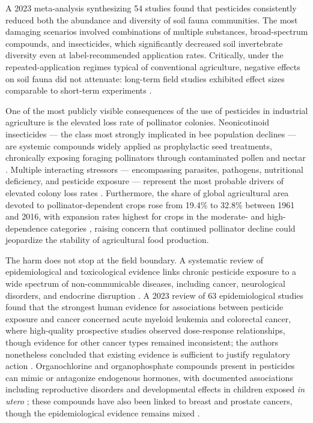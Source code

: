 A 2023 meta-analysis synthesizing 54 studies found that pesticides
consistently reduced both the abundance and diversity of soil fauna
communities. The most damaging scenarios involved combinations of multiple substances, broad-spectrum compounds, and insecticides, which significantly decreased soil invertebrate diversity even at label-recommended application rates.
Critically, under the repeated-application regimes typical of conventional agriculture, negative effects on soil fauna did not attenuate: long-term field studies exhibited effect sizes comparable to short-term experiments \cite[Sections~3.2--3.3,~4.2]{beaumelle2023}.
 

One of the most publicly visible consequences of the use of pesticides in industrial agriculture is the elevated loss rate of pollinator colonies. Neonicotinoid insecticides --- the class most strongly implicated in bee population declines --- are systemic compounds widely applied as prophylactic seed treatments, chronically exposing foraging pollinators through contaminated pollen and nectar \cite[pp.~1255957-4--1255957-5]{goulson2015bees}. Multiple interacting stressors --- encompassing parasites, pathogens, nutritional deficiency, and pesticide exposure --- represent the most probable drivers of elevated colony loss rates \cite[p.~1255957-5]{goulson2015bees}. Furthermore, the share of global agricultural area devoted to pollinator-dependent crops rose from 19.4\% to 32.8\% between 1961 and 2016, with expansion rates highest for crops in the moderate- and high-dependence categories \cite[p.~3520]{aizen2019pollinator}, raising concern that continued pollinator decline could jeopardize the stability of agricultural food production.
 
The harm does not stop at the field boundary.
A systematic review of epidemiological and toxicological evidence links chronic pesticide exposure to a wide spectrum of non-communicable diseases, including cancer, neurological disorders, and endocrine disruption \cite[Sections~5--6]{SHEKHAR2024101840}.
A 2023 review of 63 epidemiological studies found that the strongest human evidence for associations between pesticide exposure and cancer concerned acute myeloid leukemia and colorectal cancer, where high-quality prospective studies observed dose-response relationships, though evidence for other cancer types remained inconsistent; the authors nonetheless concluded that existing evidence is sufficient to justify regulatory action \cite[pp.~904--907]{cavalier2023}.
Organochlorine and organophosphate compounds present in pesticides can mimic or antagonize endogenous hormones, with documented associations including reproductive disorders and developmental effects in children exposed \textit{in utero} \cite[Sections~5.1--5.2,~6.3]{SHEKHAR2024101840}; these compounds have also been linked to breast and prostate cancers, though the epidemiological evidence remains mixed \cite[pp.~900--901,~904]{cavalier2023}.
 
